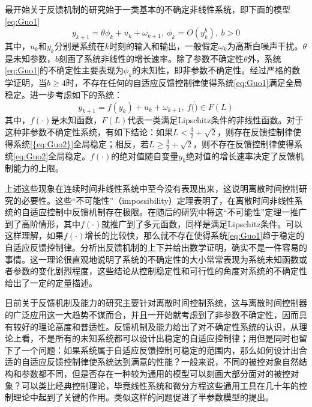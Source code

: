 最开始关于反馈机制的研究始于一类基本的不确定非线性系统，即下面的模型\eqref{eq:Guo1}
\begin{equation}%
\label{eq:Guo1}
y_{k+1} = \theta \phi_{k} + u_{k} + \omega_{k+1},\ \phi_{k}=O(y_{k}^{b}),\ b>0
\end{equation}
其中，$u_{k}$和$y_{k}$分别是系统在$k$时刻的输入和输出，一般假定$\omega_{k}$为高斯白噪声干扰。$\theta$是未知参数，$b$刻画了系统非线性的增长速率。除了参数不确定性$\theta$外，系统\eqref{eq:Guo1}的不确定性主要表现为$\phi_{k}$的未知性，即非参数不确定性。经过严格的数学证明，当$b\geq4$时，不存在任何的自适应反馈控制律使得系统\eqref{eq:Guo1}满足全局稳定。进一步考虑如下的系统：
\begin{equation}%
\label{eq:Guo2}
y_{k+1} = f(y_{k}) + u_{k} + \omega_{k+1},\ f(\dot)\in F(L)
\end{equation}
其中，$f(\cdot)$是未知函数，$F(L)$代表一类满足Lipschitz条件的非线性函数。对于这种非参数不确定性系统，有如下结论：如果$L<\frac32+\sqrt{2}$，则存在反馈控制律使得系统\eqref{{eq:Guo2}}全局稳定；相反，若$L\geq\frac32+\sqrt{2}$，则不存在反馈控制律使得系统\eqref{eq:Guo2}全局稳定。$f(\cdot)$的绝对值随自变量$y_{k}$绝对值的增长速率决定了反馈机制能力的上限。

上述这些现象在连续时间非线性系统中至今没有表现出来，这说明离散时间控制研究的必要性。这些“不可能性”（impossibility）定理表明了，在离散时间非线性系统的自适应控制中反馈机制存在极限。在随后的研究中将这“不可能性”定理一推广到了高阶情形，其中$f(\cdot)$就推广到了多元函数，同样是满足Lipschitz条件。可以这样理解，如果$f(\cdot)$增长的比较快，那么就不存在使得系统\eqref{eq:Guo1}趋于稳定的自适应反馈控制律。分析出反馈机制的上下并给出数学证明，确实不是一件容易的事情。这一理论很直观地说明了系统的不确定性的大小常常表现为系统未知函数或者参数的变化剧烈程度，这些结论从控制稳定性和可行性的角度对系统的不确定性给出了一定的定量描述。

目前关于反馈机制及能力的研究主要针对离散时间控制系统，这与离散时间控制器的广泛应用这一大趋势不谋而合，并且一开始就考虑到了非参数不确定性，因而具有较好的理论高度和普适性。反馈机制及能力给出了对不确定性系统的认识，从理论上看，不是所有的未知系统都可以设计出稳定的自适应控制律；用但是同时也留下了一个问题：如果系统属于自适应反馈控制可稳定的范围内，那么如何设计出合适的自适应反馈控制律使系统达到满意的性能？一般来说，不同的被控对象自然结构和参数都不同，但是否存在一种较为通用的模型可以刻画大部分面对的被控对象？可以类比经典控制理论，毕竟线性系统和微分方程这些通用工具在几十年的控制理论中起到了关键的作用。类似这样的问题促进了半参数模型的提出。

